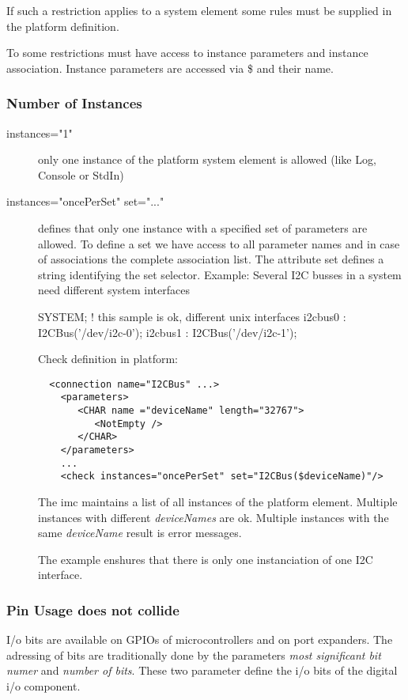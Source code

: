 If such a restriction applies  to a system element some rules must be supplied 
in the platform definition.

To some restrictions must have access to instance parameters and instance association.
Instance parameters are accessed via \$ and their name.

\subsubsection{Number of Instances}
\begin{description}
\item[instances="1"] only one instance of the platform system element
   is allowed (like  Log, Console or StdIn)
\item[instances="oncePerSet" set="..."] defines that only one instance with a 
  specified set of parameters are allowed. To define a set we have access to 
  all parameter names and in case of associations the complete association list.
  The attribute set defines a string identifying the set selector. 
  \newline
  Example: Several I2C busses in a system need different system interfaces

  \begin{PEARLCode}
  SYSTEM;
     ! this sample is ok, different unix interfaces
     i2cbus0 : I2CBus('/dev/i2c-0');
     i2cbus1 : I2CBus('/dev/i2c-1');
  \end{PEARLCode}

  Check definition in platform:
  
  \begin{verbatim}
  <connection name="I2CBus" ...>
    <parameters>
       <CHAR name ="deviceName" length="32767">
          <NotEmpty />
       </CHAR>
    </parameters>
    ...
    <check instances="oncePerSet" set="I2CBus($deviceName)"/>
  \end{verbatim}

  The imc maintains a list of all instances of the platform element.
  Multiple instances with different \textit{deviceNames} are ok.
  Multiple instances with the same \textit{deviceName} result is
  error messages.

  The example enshures that there is only one instanciation of 
  one I2C interface. 
\end{description}

\subsubsection{Pin Usage does not collide}
I/o bits are available on GPIOs of microcontrollers and on port expanders.
The adressing of bits are traditionally done by the parameters
\textit{most significant bit numer} and
\textit{number of bits}. These two parameter define the i/o bits of the 
digital i/o component.

